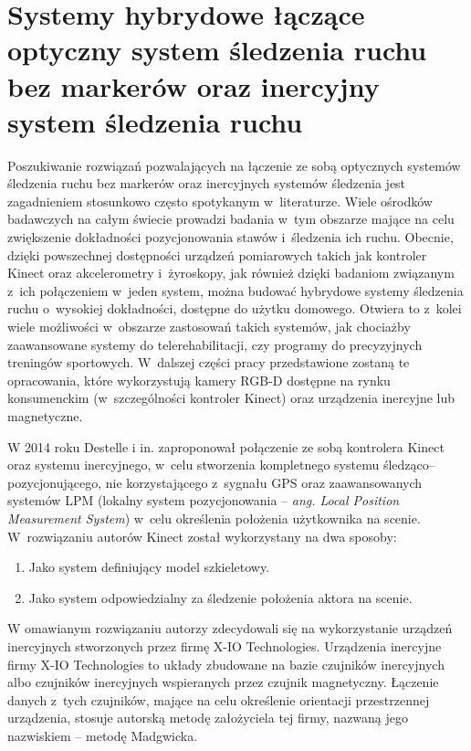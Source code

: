 \section{Systemy hybrydowe łączące optyczny system śledzenia ruchu bez markerów oraz inercyjny system śledzenia ruchu} \label{sec:literature:hybrids}
Poszukiwanie rozwiązań pozwalających na łączenie ze sobą optycznych systemów śledzenia ruchu bez markerów oraz inercyjnych systemów śledzenia jest zagadnieniem stosunkowo często spotykanym w~literaturze. Wiele ośrodków badawczych na całym świecie prowadzi badania w~tym obszarze mające na celu zwiększenie dokładności pozycjonowania stawów i~śledzenia ich ruchu. Obecnie, dzięki powszechnej dostępności urządzeń pomiarowych takich jak kontroler Kinect oraz akcelerometry i~żyroskopy, jak również dzięki badaniom związanym z~ich połączeniem w~jeden system, można budować hybrydowe systemy śledzenia ruchu o~wysokiej dokładności, dostępne do użytku domowego. Otwiera to z~kolei wiele możliwości w~obszarze zastosowań takich systemów, jak chociażby zaawansowane systemy do telerehabilitacji, czy programy do precyzyjnych treningów sportowych. W~dalszej części pracy przedstawione zostaną te opracowania, które wykorzystują kamery RGB-D dostępne na rynku konsumenckim (w~szczególności kontroler Kinect) oraz urządzenia inercyjne lub magnetyczne. 

W 2014 roku Destelle i in. \cite{Destelle2014} zaproponował połączenie ze sobą kontrolera Kinect oraz systemu inercyjnego, w~celu stworzenia kompletnego systemu śledząco--pozycjonującego, nie korzystającego z~sygnału GPS oraz zaawansowanych systemów LPM (lokalny system pozycjonowania -- \emph{ang. Local Position Measurement System}) w~celu określenia położenia użytkownika na scenie. W~rozwiązaniu autorów Kinect został wykorzystany na dwa sposoby:
\begin{enumerate}
	\item Jako system definiujący model szkieletowy.
	\item Jako system odpowiedzialny za śledzenie położenia aktora na scenie.
\end{enumerate}
									
W omawianym rozwiązaniu autorzy zdecydowali się na wykorzystanie urządzeń inercyjnych stworzonych przez firmę X-IO Technologies. Urządzenia inercyjne firmy X-IO Technologies to układy zbudowane na bazie czujników inercyjnych albo czujników inercyjnych wspieranych przez czujnik magnetyczny. Łączenie danych z~tych czujników, mające na celu określenie orientacji przestrzennej urządzenia, stosuje autorską metodę założyciela tej firmy, nazwaną jego nazwiskiem -- metodę Madgwicka.

